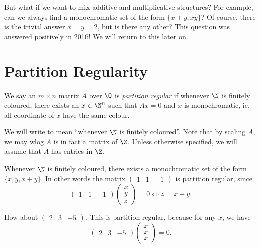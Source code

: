 \documentclass[a4paper]{article}
\begin{document}
But what if we want to mix additive and multiplicative structures? For example, can we always find a monochromatic set of the form $\{x + y, xy\}$? Of course, there is the trivial answer $x = y = 2$, but is there any other? This question was answered positively in 2016! We will return to this later on.

\section{Partition Regularity}
\begin{defi}
  We say an $m \times n$ matrix $A$ over $\Q$ is \emph{partition regular} if whenever $\N$ is finitely coloured, there exists an $x \in \N^n$ such that $Ax = 0$ and $x$ is monochromatic, ie. all coordinate of $x$ have the same colour.
\end{defi}
We will write  to mean ``whenever $\N$ is finitely coloured''. Note that by scaling $A$, we may wlog $A$ is in fact a matrix of $\Z$. Unless otherwise specified, we will assume that $A$ has entries in $\Z$.

\begin{eg}
  Whenever $\N$ is finitely coloured, there exists a monochromatic set of the form $\{x, y, x + y\}$. In other words the matrix $\begin{pmatrix}1 & 1 & -1\end{pmatrix}$ is partition regular, since
  \[
    \begin{pmatrix}
      1 & 1 & -1
    \end{pmatrix}
    \begin{pmatrix}
      x\\y\\z
    \end{pmatrix} = 0 \Longleftrightarrow z = x + y.
  \]
\end{eg}

\begin{eg}
  How about $\begin{pmatrix}2 & 3 & -5\end{pmatrix}$. This is partition regular, because for any $x$, we have
  \[
    \begin{pmatrix}
      2 & 3 & -5
    \end{pmatrix}
    \begin{pmatrix}
      x\\x\\x
    \end{pmatrix} = 0.
  \]
\end{eg}
\end{document}
